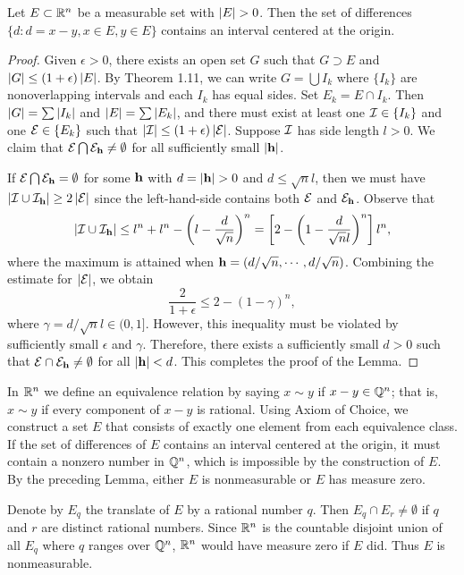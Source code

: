 \begin{lemma}
  Let $E \subset \mathbb{R}^n$ be a measurable set with $\left\vert E\right\vert > 0$.
  Then the set of differences
  $\{d : d = x-y, x \in E, y \in E\}$
  contains an interval centered at the origin.
\end{lemma}
\begin{proof}
  Given $\epsilon > 0$, there exists an open set $G$
  such that $G \supset E$ and $\left\vert G\right\vert \le (1+\epsilon) \left\vert E\right\vert$.
  By Theorem 1.11, we can write $G = \bigcup I_k$
  where $\{I_k\}$ are nonoverlapping intervals
  and each $I_k$ has equal sides.
  Set $E_k = E \cap I_k$.
  Then $\left\vert G\right\vert = \sum \left\vert I_k\right\vert$ and $\left\vert E\right\vert = \sum \left\vert E_k\right\vert$,
  and there must exist at least one $\mathcal{I} \in \{I_k\}$ and one $\mathcal{E} \in \{E_k\}$
  such that $\left\vert\mathcal{I}\right\vert \le (1+\epsilon) \left\vert\mathcal{E}\right\vert$.
  Suppose $\mathcal{I}$ has side length $l > 0$.
  We claim that $\mathcal{E} \bigcap \mathcal{E}_{\mathbf{h}} \neq \emptyset$
  for all sufficiently small $|\mathbf{h}|$.

  If $\mathcal{E} \bigcap \mathcal{E}_{\mathbf{h}} = \emptyset$ for some $\mathbf{h}$
  with $d = |\mathbf{h}| > 0$ and $d \le \sqrt{n} l$,
  then we must have $\left\vert\mathcal{I} \cup \mathcal{I}_{\mathbf{h}}\right\vert \ge 2 \left\vert\mathcal{E}\right\vert$
  since the left-hand-side contains both $\mathcal{E}$ and $\mathcal{E}_{\mathbf{h}}$.
  Observe that %
  \[
    \left\vert\mathcal{I} \cup \mathcal{I}_{\mathbf{h}}\right\vert \le l^n + l^n - \left( l - \frac{d}{\sqrt{n}} \right)^n
    = \left[ 2 - \left( 1 - \frac{d}{\sqrt{n} l} \right)^n \right] l^n,
  \]
  where the maximum is attained when
  $\mathbf{h} = \left(d / \sqrt{n}, \cdots, d / \sqrt{n}\right)$.
  Combining the estimate for $\left\vert\mathcal{E}\right\vert$, we obtain
  \[
    \frac{2}{1 + \epsilon} \le  2 - \left( 1 - \gamma \right)^n,
  \]
  where $\gamma = d / \sqrt{n} l \in (0, 1]$.
  However, this inequality must be violated
  by sufficiently small $\epsilon$ and $\gamma$.
  Therefore, there exists a sufficiently small $d > 0$
  such that $\mathcal{E} \cap \mathcal{E}_{\mathbf{h}} \neq \emptyset$
  for all $|\mathbf{h}| < d$.
  This completes the proof of the Lemma.
\end{proof}

\begin{exercise}{3.19}
  In $\mathbb{R}^n$ we define an equivalence relation by saying
  $x \sim y$ if $x - y \in \mathbb{Q}^n$;
  that is, $x \sim y$ if every component of $x-y$ is rational.
  Using Axiom of Choice,
  we construct a set $E$ that consists of exactly one element
  from each equivalence class.
  If the set of differences of $E$ contains an interval centered at the origin,
  it must contain a nonzero number in $\mathbb{Q}^n$,
  which is impossible by the construction of $E$.
  By the preceding Lemma,
  either $E$ is nonmeasurable or $E$ has measure zero.

  Denote by $E_q$ the translate of $E$ by a rational number $q$.
  Then $E_q \cap E_r \neq \emptyset$ if $q$ and $r$ are distinct rational numbers.
  Since $\mathbb{R}^n$ is the countable disjoint union of all $E_q$
  where $q$ ranges over $\mathbb{Q}^n$,
  $\mathbb{R}^n$ would have measure zero if $E$ did.
  Thus $E$ is nonmeasurable.
\end{exercise}


